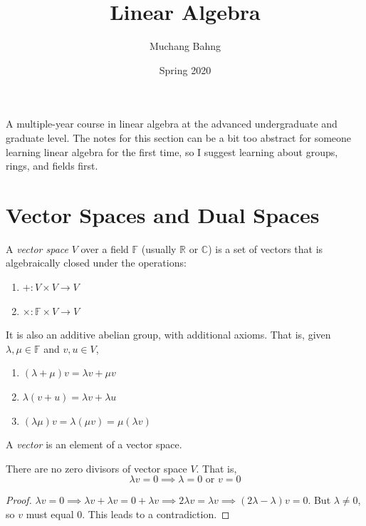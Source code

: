 \documentclass{article}
\begin{document}
\title{Linear Algebra}
\author{Muchang Bahng}
\date{Spring 2020}

\maketitle
\tableofcontents
\pagebreak

A multiple-year course in linear algebra at the advanced undergraduate and graduate level. The notes for this section can be a bit too abstract for someone learning linear algebra for the first time, so I suggest learning about groups, rings, and fields first. 

\section{Vector Spaces and Dual Spaces}

  \begin{definition}
    A \textit{vector space} $V$ over a field $\mathbb{F}$ (usually $\mathbb{R}$ or $\mathbb{C}$) is a set of vectors that is algebraically closed under the operations: 
    \begin{enumerate}
      \item $+: V \times V \longrightarrow V$
      \item $\times: \mathbb{F} \times V \longrightarrow V$
    \end{enumerate}
    It is also an additive abelian group, with additional axioms. That is, given $\lambda, \mu \in \mathbb{F}$ and $v, u \in V$, 
    \begin{enumerate}
      \item $(\lambda + \mu) v = \lambda v + \mu v$
      \item $\lambda (v + u) = \lambda v + \lambda u$
      \item $(\lambda \mu) v = \lambda (\mu v) = \mu (\lambda v)$ 
    \end{enumerate}
  \end{definition} 

  \begin{definition}[Vector]
    A \textit{vector} is an element of a vector space. 
  \end{definition}

  \begin{proposition}
    There are no zero divisors of vector space $V$. That is, 
    \begin{equation}
      \lambda v = 0 \implies \lambda = 0 \text{ or } v = 0
    \end{equation}
  \end{proposition}
  \begin{proof}
    $\lambda v = 0 \implies \lambda v + \lambda v = 0 + \lambda v \implies 2\lambda v = \lambda v \implies (2\lambda - \lambda ) v = 0$. But $\lambda \neq 0$, so $v$ must equal $0$. This leads to a contradiction. 
  \end{proof}
\end{document}

